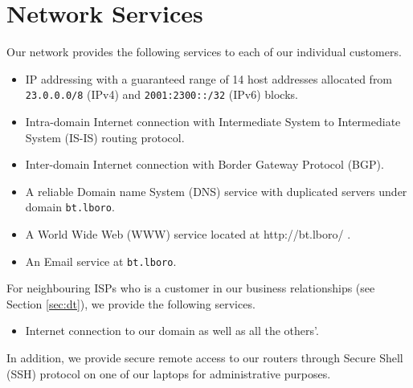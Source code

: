\section{Network Services}
\label{sec:services}

Our network provides the following services to each of our individual customers.

\begin{itemize}
\item
	IP addressing with a guaranteed range of 14 host addresses allocated from \texttt{23.0.0.0/8} (IPv4) and \texttt{2001:2300::/32} (IPv6) blocks.
\item
	Intra-domain Internet connection with Intermediate System to Intermediate System (IS-IS) routing protocol.
\item
	Inter-domain Internet connection with Border Gateway Protocol (BGP).
\item
	A reliable Domain name System (DNS) service with duplicated servers under domain \texttt{bt.lboro}.
\item
	A World Wide Web (WWW) service located at http://bt.lboro/ .
\item
	An Email service at \texttt{bt.lboro}.
\end{itemize}



For neighbouring ISPs who is a customer in our business relationships (see Section \ref{sec:dt}), we provide the following services.

\begin{itemize}
\item
	Internet connection to our domain as well as all the others'.
\end{itemize}



In addition, we provide secure remote access to our routers through Secure Shell (SSH) protocol on one of our laptops for administrative purposes.

